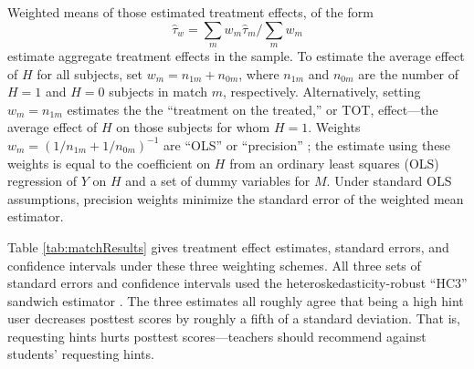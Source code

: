 \documentclass{article}\usepackage[]{graphicx}\usepackage[]{color}
\begin{document}
Weighted means of those estimated treatment effects, of the form
\begin{equation}\label{eq:tauWeightedMean}
\hat{\tau}_w=\sum_m w_m\hat{\tau}_m/\sum_m w_m
\end{equation}
estimate aggregate
treatment effects in the sample.
To estimate the average effect of $H$ for all subjects, set $w_m=
n_{1m}+n_{0m}$, where $n_{1m}$ and $n_{0m}$ are the number of
$H=1$ and $H=0$ subjects in match $m$, respectively.
Alternatively, setting $w_m=n_{1m}$ estimates the the ``treatment on the
treated,'' or TOT, effect---the average effect of
$H$ on those subjects for whom $H=1$.
Weights $w_m=(1/n_{1m}+1/n_{0m})^{-1}$ are ``OLS'' or
``precision'' \citep[c.f.][]{schochet2015statistical}; the
estimate using these weights is equal to the coefficient on $H$ from
an ordinary least squares (OLS) regression of $Y$ on $H$ and a set of dummy
variables for $M$.
Under standard OLS assumptions, precision weights minimize the
standard error of the weighted mean estimator.



Table \ref{tab:matchResults} gives treatment effect estimates,
standard errors, and confidence intervals under these three weighting
schemes.
All three sets of standard errors
and confidence intervals used the heteroskedasticity-robust ``HC3'' sandwich estimator
\citep{sandwichPackage}.
The three estimates all roughly agree that being a high hint user
decreases posttest scores by roughly a fifth of a standard deviation.
That is, requesting hints hurts posttest scores---teachers should
recommend against students' requesting hints.
\end{document}
